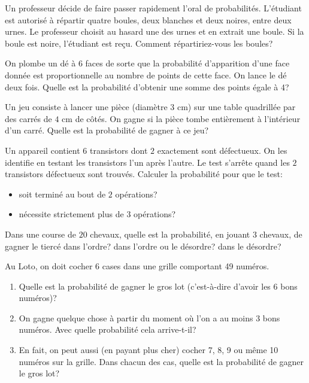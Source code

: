 \documentclass{yann}
\begin{document}
Un professeur décide de faire passer rapidement l'oral de \og{}probabilités\fg{}.
L'étudiant est autorisé à répartir quatre boules, deux blanches et deux noires,
entre deux urnes. Le professeur choisit au hasard une des urnes et en extrait
une boule. Si la boule est noire, l'étudiant est reçu.
Comment répartiriez-vous les boules?

\Exercice

On plombe un dé à 6 faces de sorte que la probabilité d'apparition d'une face
donnée est proportionnelle au nombre de points de cette face.
On lance le dé deux fois.
Quelle est la probabilité d'obtenir une somme des points égale à 4?

\Exercice

Un jeu consiste à lancer une pièce (diamètre $3$ cm) sur une table
quadrillée par des carrés de $4$ cm de côtés.
On gagne si la pièce tombe entièrement à l'intérieur d'un carré.
Quelle est la probabilité de gagner à ce jeu?

\Exercice

Un appareil contient $6$ transistors dont $2$ exactement sont défectueux.
On les identifie en testant les transistors l'un après l'autre.
Le test s'arrête quand les $2$ transistors défectueux sont trouvés.
Calculer la probabilité pour que le test:
\begin{itemize}
\item
soit terminé au bout de $2$ opérations?
\item
nécessite strictement plus de $3$ opérations?
\end{itemize}

\Exercice

Dans une course de $20$ chevaux, quelle est la probabilité, en jouant
$3$ chevaux, de gagner le tiercé dans l'ordre?
dans l'ordre ou le désordre?
dans le désordre?

\Exercice

Au Loto, on doit cocher 6 cases dans une grille comportant 49 numéros.
\begin{enumerate}
\item
Quelle est la probabilité de gagner le gros lot (c'est-à-dire d'avoir les 6 bons numéros)?
\item
On gagne quelque chose à partir du moment où l'on a au moins 3 bons numéros.
  Avec quelle probabilité cela arrive-t-il?
\item
En fait, on peut aussi (en payant plus cher) cocher 7, 8, 9 ou même 10 numéros
  sur la grille. Dans chacun des cas, quelle est la probabilité de gagner le
  gros lot?
\end{enumerate}
\end{document}

